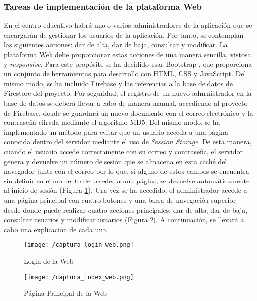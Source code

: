 \subsubsection{Tareas de implementación de la plataforma Web}
En el centro educativo habrá uno o varios administradores de la aplicación que se encargarán de gestionar los usuarios de la aplicación. Por tanto, se contemplan las siguientes acciones: dar de alta, dar de baja, consultar y modificar. La plataforma Web debe proporcionar estas acciones de una manera sencilla, vistosa y \textit{responsive}. Para este propósito se ha decidido usar Bootstrap \cite{Bootstrap}, que proporciona un conjunto de herramientas para desarrollo con HTML, CSS y JavaScript. Del mismo modo, se ha incluido Firebase y las referencias a la base de datos de Firestore del proyecto. Por seguridad, el registro de un nuevo administrador en la base de datos se deberá llevar a cabo de manera manual, accediendo al proyecto de Firebase, donde se guardará un nuevo documento con el correo electrónico y la contraseña cifrada mediante el algoritmo MD5. Del mismo modo, se ha implementado un método para evitar que un usuario acceda a una página conocida dentro del servidor mediante el uso de \textit{Session Storage}. De esta manera, cuando el usuario accede correctamente con su correo y contraseña, el servidor genera y devuelve un número de sesión que se almacena en esta caché del navegador junto con el correo por lo que, si alguno de estos campos se encuentra sin definir en el momento de acceder a una página, se devuelve automáticamente al inicio de sesión (Figura \ref{fig:login_web}). Una vez se ha accedido, el administrador accede a una página principal con cuatro botones y una barra de navegación superior desde donde puede realizar cuatro acciones principales: dar de alta, dar de baja, consultar usuarios y modificar usuarios (Figura \ref{fig:index_web}). A continuación, se llevará a cabo una explicación de cada uno.

\begin{figure}[!h]
	\begin{center}
		\texttt{[image: /captura\_login\_web.png]}
		\caption{Login de la Web}
		\label{fig:login_web}
	\end{center}
\end{figure}

\begin{figure}[!h]
	\begin{center}
		\texttt{[image: /captura\_index\_web.png]}
		\caption{Página Principal de la Web}
		\label{fig:index_web}
	\end{center}
\end{figure}

